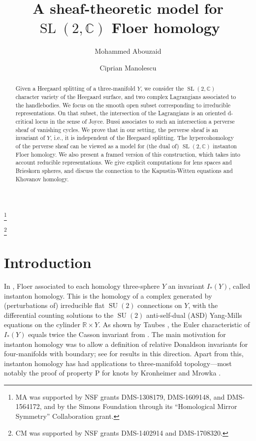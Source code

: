 \documentclass [11pt]{amsart}
\theoremstyle{remark}
\def\rr {{\mathbb{R}}}
\def\cc {{\mathbb{C}}}
\def\R{\rr}
\def\sl {{\operatorname{SL}(2, \cc)}}
\def\su {{\operatorname{SU}(2)}}
\begin{document}
\title{A sheaf-theoretic model for $\sl$ Floer homology}

\author[Mohammed Abouzaid]{Mohammed Abouzaid}
\thanks {MA was supported by NSF grants DMS-1308179, DMS-1609148, and DMS-1564172, and by the Simons Foundation through its ``Homological Mirror Symmetry'' Collaboration grant.}
\address {Department of Mathematics, Columbia University, 2990 Broadway, MC 4406 \\
New York, NY 10027}


\author[Ciprian Manolescu]{Ciprian Manolescu}
\thanks {CM was supported by NSF grants DMS-1402914 and DMS-1708320.}
\address {Department of Mathematics, UCLA, 520 Portola Plaza, Box 951555\\ Los Angeles, CA 90095}


\begin{abstract}
Given a Heegaard splitting of a three-manifold $Y$, we consider the $\sl$ character variety of the Heegaard surface, and two complex Lagrangians associated to the handlebodies. We focus on the smooth open subset corresponding to irreducible representations. On that subset, the intersection of the Lagrangians is an oriented d-critical locus in the sense of Joyce. Bussi associates to such an intersection a perverse sheaf of vanishing cycles. We prove that in our setting, the perverse sheaf is an invariant of $Y$, i.e., it is independent of the Heegaard splitting. The hypercohomology of the perverse sheaf can be viewed as a model for (the dual of) $\sl$ instanton Floer homology. We also present a framed version of this construction, which takes into account reducible representations. We give explicit computations for lens spaces and Brieskorn spheres, and discuss the connection to the Kapustin-Witten equations and Khovanov homology. 
\end {abstract}

\maketitle

\section{Introduction}

In \cite{Floer}, Floer associated to each homology three-sphere $Y$ an invariant $I_*(Y)$, called instanton homology. This is the homology of a complex generated by (perturbations of) irreducible flat $\su$ connections on $Y$, with the differential counting solutions to the $\su$ anti-self-dual (ASD) Yang-Mills equations on the cylinder $\R \times Y$. As shown by Taubes \cite{TaubesCasson}, the Euler characteristic of $I_*(Y)$ equals twice the Casson invariant from \cite{AMCasson}. The main motivation for instanton homology was to allow a definition of relative Donaldson invariants for four-manifolds with boundary; see \cite{DonaldsonBook} for results in this direction. Apart from this, instanton homology has had applications to three-manifold topology---most notably the proof of property P for knots by Kronheimer and Mrowka \cite{KMPropP}. 
\end{document}
